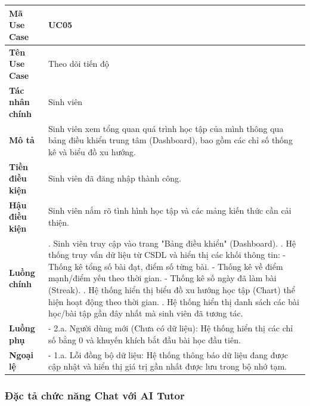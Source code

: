 \documentclass[../main.tex]{subfiles}
\begin{document}
{
\renewcommand{\arraystretch}{1.5}
\begin{tabularx}{\textwidth}{|p{3.5cm}|>{\raggedright\arraybackslash}X|}
\caption{Bảng đặc tả chức năng Theo dõi tiến độ}
\label{tab:bang-dac-ta-chuc-nang-theo-doi-tien-do}
\\
\hline
\textbf{Mã Use Case} & UC05 \\
\hline
\textbf{Tên Use Case} & Theo dõi tiến độ \\
\hline
\textbf{Tác nhân chính} & Sinh viên \\
\hline
\textbf{Mô tả} & Sinh viên xem tổng quan quá trình học tập của mình thông qua bảng điều khiển trung tâm (Dashboard), bao gồm các chỉ số thống kê và biểu đồ xu hướng. \\
\hline
\textbf{Tiền điều kiện} & Sinh viên đã đăng nhập thành công. \\
\hline
\textbf{Hậu điều kiện} & Sinh viên nắm rõ tình hình học tập và các mảng kiến thức cần cải thiện. \\
\hline
\textbf{Luồng chính} & 1. Sinh viên truy cập vào trang "Bảng điều khiển" (Dashboard). \newline 2. Hệ thống truy vấn dữ liệu từ CSDL và hiển thị các khối thông tin: \newline - Thống kê tổng số bài đạt, điểm số từng bài. \newline - Thống kê về điểm mạnh/điểm yếu theo thời gian. \newline - Thống kê số ngày đã làm bài (Streak). \newline 3. Hệ thống hiển thị biểu đồ xu hướng học tập (Chart) thể hiện hoạt động theo thời gian. \newline 4. Hệ thống hiển thị danh sách các bài học/bài tập gần đây nhất mà sinh viên đã tương tác. \\
\hline
\textbf{Luồng phụ} & - 2.a. Người dùng mới (Chưa có dữ liệu): Hệ thống hiển thị các chỉ số bằng 0 và khuyến khích bắt đầu bài học đầu tiên. \\
\hline
\textbf{Ngoại lệ} & - 1.a. Lỗi đồng bộ dữ liệu: Hệ thống thông báo dữ liệu đang được cập nhật và hiển thị giá trị gần nhất được lưu trong bộ nhớ tạm. \\
\hline
\end{tabularx}
}

\subsubsection{Đặc tả chức năng Chat với AI Tutor}
\end{document}
